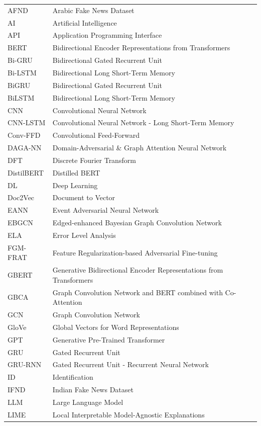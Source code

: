 \documentclass[stu,12pt,floatsintext,donotrepeattitle]{apa7}
\begin{document}
\begin{longtable}{p{3cm} p{10cm}}
AFND & Arabic Fake News Dataset \\
AI & Artificial Intelligence \\
API & Application Programming Interface \\
BERT & Bidirectional Encoder Representations from Transformers \\
Bi-GRU & Bidirectional Gated Recurrent Unit \\
Bi-LSTM & Bidirectional Long Short-Term Memory \\
BiGRU & Bidirectional Gated Recurrent Unit \\
BiLSTM & Bidirectional Long Short-Term Memory \\
CNN & Convolutional Neural Network \\
CNN-LSTM & Convolutional Neural Network - Long Short-Term Memory \\
Conv-FFD & Convolutional Feed-Forward \\
DAGA-NN & Domain-Adversarial \& Graph Attention Neural Network \\
DFT & Discrete Fourier Transform \\
DistilBERT & Distilled BERT \\
DL & Deep Learning \\
Doc2Vec & Document to Vector \\
EANN & Event Adversarial Neural Network \\
EBGCN & Edged-enhanced Bayesian Graph Convolution Network \\
ELA & Error Level Analysis \\
FGM-FRAT & Feature Regularization-based Adversarial Fine-tuning \\
GBERT & Generative Bidirectional Encoder Representations from Transformers \\
GBCA & Graph Convolution Network and BERT combined with Co-Attention \\
GCN & Graph Convolution Network \\
GloVe & Global Vectors for Word Representations \\
GPT & Generative Pre-Trained Transformer \\
GRU & Gated Recurrent Unit \\
GRU-RNN & Gated Recurrent Unit - Recurrent Neural Network \\
ID & Identification \\
IFND & Indian Fake News Dataset \\
LLM & Large Language Model \\
LIME & Local Interpretable Model-Agnostic Explanations \\

\end{longtable}
\end{document}
